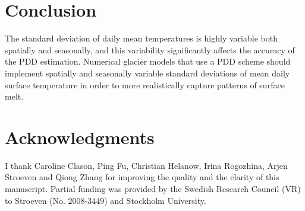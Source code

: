 \documentclass[review]{igs}
\begin{document}

\section{Conclusion}

The standard deviation of daily mean temperatures is highly variable both spatially and seasonally, and this variability significantly affects the accuracy of the PDD estimation. Numerical glacier models that use a PDD scheme should implement spatially and seasonally variable standard deviations of mean daily surface temperature in order to more realistically capture patterns of surface melt.


\section{Acknowledgments}

I thank Caroline Clason, Ping Fu, Christian Helanow, Irina Rogozhina, Arjen Stroeven and Qiong Zhang for improving the quality and the clarity of this manuscript. Partial funding was provided by the Swedish Research Council (VR) to Stroeven (No. 2008-3449) and Stockholm University.



\end{document}
